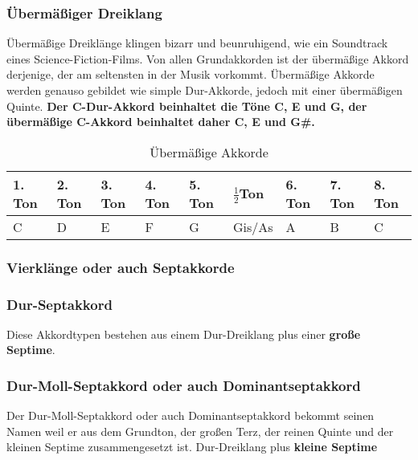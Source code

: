 \subsubsection*{Übermäßiger Dreiklang}
Übermäßige Dreiklänge klingen bizarr und beunruhigend, wie ein Soundtrack eines Science-Fiction-Films. Von allen Grundakkorden ist der übermäßige Akkord derjenige, der am seltensten in der Musik vorkommt. Übermäßige Akkorde werden genauso gebildet wie simple Dur-Akkorde, jedoch mit einer übermäßigen Quinte. \textbf{Der C-Dur-Akkord beinhaltet die Töne C, E und G, der übermäßige C-Akkord beinhaltet daher C, E und G\#.}

\begin{table}[H]
    \caption{Übermäßige Akkorde}
    \scriptsize
    \begin{tabularx}{\textwidth}{|X|X|X|X|p{1.4cm}|X|X|X|X|}
    \hline
    1. Ton & 2. Ton & 3. Ton & 4. Ton & 5. Ton & $\frac{1}{2}$Ton & 6. Ton & 7. Ton & 8. Ton \\ \hline
    \cellcolor{gray!25}C & D & \cellcolor{gray!25}E & F & G & \cellcolor{gray!25}Gis/As & A & B & C \\ \hline  
    \end{tabularx}
\end{table}


\subsubsection{Vierklänge oder auch Septakkorde}

\subsubsection*{Dur-Septakkord}
Diese Akkordtypen bestehen aus einem Dur-Dreiklang plus einer \textbf{große Septime}.

\subsubsection*{Dur-Moll-Septakkord oder auch Dominantseptakkord}
Der Dur-Moll-Septakkord oder auch Dominantseptakkord bekommt seinen Namen weil er aus dem Grundton, der großen Terz, der reinen Quinte und der kleinen Septime zusammengesetzt ist.
Dur-Dreiklang plus \textbf{kleine Septime}

